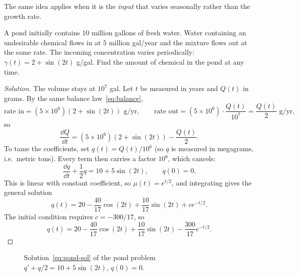 The same idea applies when it is the \emph{input} that varies seasonally rather than the
growth rate.

\begin{eg}
	A pond initially contains \(10\) million gallons of fresh water. Water containing an
	undesirable chemical flows in at \(5\) million gal/year and the mixture flows out at
	the same rate. The incoming concentration varies periodically:
	\(\gamma(t) = 2 + \sin(2t)\) g/gal. Find the amount of chemical in the pond at any
	time.
\end{eg}

\begin{proof}[Solution]
	The volume stays at \(10^7\) gal. Let \(t\) be measured in years and \(Q(t)\) in
	grams. By the same balance law~\eqref{eq:balance},
	\[
		\text{rate in} = (5 \times 10^6)\left( 2 + \sin(2t) \right) \text{ g/yr},
		\qquad
		\text{rate out} = (5 \times 10^6)\cdot \frac{Q(t)}{10^7} = \frac{Q(t)}{2}
		\text{ g/yr},
	\]
	so
	\[
		\frac{\dd Q}{\dd t} = (5\times 10^6)\left( 2 + \sin (2t) \right)
		- \frac{Q(t)}{2}.
	\]
	To tame the coefficients, set \(q(t) = Q(t)/10^6\) (so \(q\) is measured in
	megagrams, i.e.\ metric tons). Every term then carries a factor \(10^6\), which
	cancels:
	\begin{equation}\label{eq:pond}
		\frac{\dd q}{\dd t} + \frac{1}{2}q = 10 + 5\sin(2t), \qquad q(0) = 0.
	\end{equation}
	This is linear with constant coefficient, so \(\mu(t) = e^{t/2}\), and integrating
	gives the general solution
	\[
		q(t) = 20 - \frac{40}{17}\cos(2t) + \frac{10}{17}\sin(2t) + ce^{-t/2}.
	\]
	The initial condition requires \(c = -300/17\), so
	\begin{equation}\label{eq:pond-sol}
		q(t) = 20 - \frac{40}{17}\cos(2t) + \frac{10}{17}\sin(2t)
		- \frac{300}{17} e^{-t/2}.
	\end{equation}
\end{proof}

\begin{figure}[H]
	\centering
	\caption{Solution~\eqref{eq:pond-sol} of the pond problem
		\(q' + q/2 = 10 + 5\sin(2t)\), \(q(0) = 0\).}
\end{figure}

